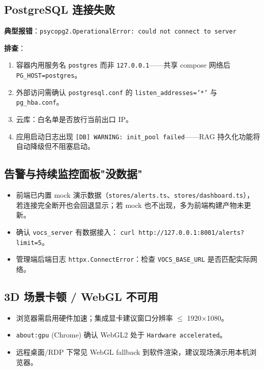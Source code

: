 \documentclass[UTF8,a4paper,11pt]{ctexart}
\begin{document}
\subsection{PostgreSQL 连接失败}

\textbf{典型报错}：\texttt{psycopg2.OperationalError: could not connect to server}

\textbf{排查}：
\begin{enumerate}[leftmargin=1.6em,itemsep=2pt]
  \item 容器内用服务名 \texttt{postgres} 而非 \texttt{127.0.0.1}——共享 compose 网络后 \texttt{PG\_HOST=postgres}。
  \item 外部访问需确认 \texttt{postgresql.conf} 的 \texttt{listen\_addresses='*'} 与 \texttt{pg\_hba.conf}。
  \item 云库：白名单是否放行当前出口 IP。
  \item 应用启动日志出现 \texttt{[DB] WARNING: init\_pool failed}——RAG 持久化功能将自动降级但不阻塞启动。
\end{enumerate}

\subsection{告警与持续监控面板"没数据"}

\begin{itemize}[leftmargin=1.4em,itemsep=2pt]
  \item 前端已内置 mock 演示数据（\texttt{stores/alerts.ts}、\texttt{stores/dashboard.ts}），
        若连接完全断开也会回退显示；若 mock 也不出现，多为前端构建产物未更新。
  \item 确认 \texttt{vocs\_server} 有数据接入：
        \texttt{curl http://127.0.0.1:8001/alerts?limit=5}。
  \item 管理端后端日志 \texttt{httpx.ConnectError}：检查 \texttt{VOCS\_BASE\_URL} 是否匹配实际网络。
\end{itemize}

\subsection{3D 场景卡顿 / WebGL 不可用}

\begin{itemize}[leftmargin=1.4em,itemsep=2pt]
  \item 浏览器需启用硬件加速；集成显卡建议窗口分辨率 $\leq$ 1920$\times$1080。
  \item \texttt{about:gpu} (Chrome) 确认 WebGL2 处于 \texttt{Hardware accelerated}。
  \item 远程桌面/RDP 下常见 WebGL fallback 到软件渲染，建议现场演示用本机浏览器。
\end{itemize}
\end{document}
